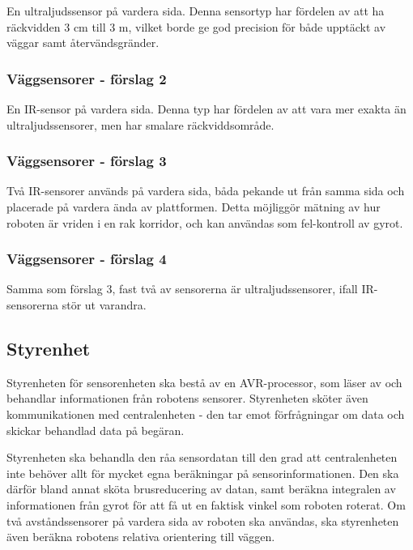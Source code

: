 \documentclass[a4paper,titlepage,12pt]{article}
\begin{document}
    En ultraljudssensor på vardera sida. Denna sensortyp har fördelen av att ha
    räckvidden 3 cm till 3 m, vilket borde ge god precision för både upptäckt
    av väggar samt återvändsgränder.

    \subsubsection{Väggsensorer - förslag 2}

    En IR-sensor på vardera sida. Denna typ har fördelen av att vara mer exakta
    än ultraljudssensorer, men har smalare räckviddsområde.

    \subsubsection{Väggsensorer - förslag 3}

    Två IR-sensorer används på vardera sida, båda pekande ut från samma sida och
    placerade på vardera ända av plattformen. Detta möjliggör mätning av hur
    roboten är vriden i en rak korridor, och kan användas som fel-kontroll av
    gyrot.

    \subsubsection{Väggsensorer - förslag 4}

    Samma som förslag 3, fast två av sensorerna är ultraljudssensorer, ifall
    IR-sensorerna stör ut varandra.

    \subsection{Styrenhet}

    Styrenheten för sensorenheten ska bestå av en AVR-processor, som läser av och behandlar
    informationen från robotens sensorer. Styrenheten sköter även
    kommunikationen med centralenheten - den tar emot förfrågningar om data och
    skickar behandlad data på begäran.

    Styrenheten ska behandla den råa sensordatan till den grad att
    centralenheten inte behöver allt för mycket egna beräkningar på
    sensorinformationen. Den ska därför bland annat sköta brusreducering av
    datan, samt beräkna integralen av informationen från gyrot för att få ut en
    faktisk vinkel som roboten roterat. Om två avståndssensorer på vardera sida
    av roboten ska användas, ska styrenheten även beräkna robotens relativa
    orientering till väggen.
    
\end{document}
